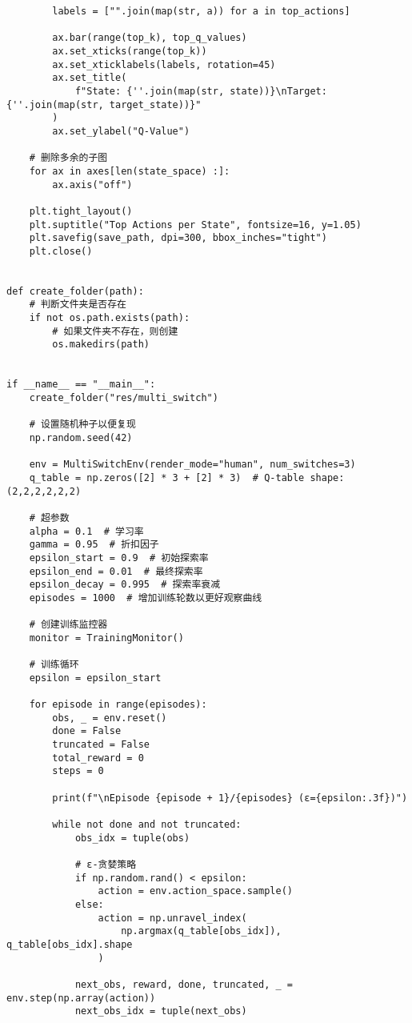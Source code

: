 \begin{verbatim}
        labels = ["".join(map(str, a)) for a in top_actions]

        ax.bar(range(top_k), top_q_values)
        ax.set_xticks(range(top_k))
        ax.set_xticklabels(labels, rotation=45)
        ax.set_title(
            f"State: {''.join(map(str, state))}\nTarget: {''.join(map(str, target_state))}"
        )
        ax.set_ylabel("Q-Value")

    # 删除多余的子图
    for ax in axes[len(state_space) :]:
        ax.axis("off")

    plt.tight_layout()
    plt.suptitle("Top Actions per State", fontsize=16, y=1.05)
    plt.savefig(save_path, dpi=300, bbox_inches="tight")
    plt.close()


def create_folder(path):
    # 判断文件夹是否存在
    if not os.path.exists(path):
        # 如果文件夹不存在，则创建
        os.makedirs(path)


if __name__ == "__main__":
    create_folder("res/multi_switch")

    # 设置随机种子以便复现
    np.random.seed(42)

    env = MultiSwitchEnv(render_mode="human", num_switches=3)
    q_table = np.zeros([2] * 3 + [2] * 3)  # Q-table shape: (2,2,2,2,2,2)

    # 超参数
    alpha = 0.1  # 学习率
    gamma = 0.95  # 折扣因子
    epsilon_start = 0.9  # 初始探索率
    epsilon_end = 0.01  # 最终探索率
    epsilon_decay = 0.995  # 探索率衰减
    episodes = 1000  # 增加训练轮数以更好观察曲线

    # 创建训练监控器
    monitor = TrainingMonitor()

    # 训练循环
    epsilon = epsilon_start

    for episode in range(episodes):
        obs, _ = env.reset()
        done = False
        truncated = False
        total_reward = 0
        steps = 0

        print(f"\nEpisode {episode + 1}/{episodes} (ε={epsilon:.3f})")

        while not done and not truncated:
            obs_idx = tuple(obs)

            # ε-贪婪策略
            if np.random.rand() < epsilon:
                action = env.action_space.sample()
            else:
                action = np.unravel_index(
                    np.argmax(q_table[obs_idx]), q_table[obs_idx].shape
                )

            next_obs, reward, done, truncated, _ = env.step(np.array(action))
            next_obs_idx = tuple(next_obs)


\end{verbatim}
